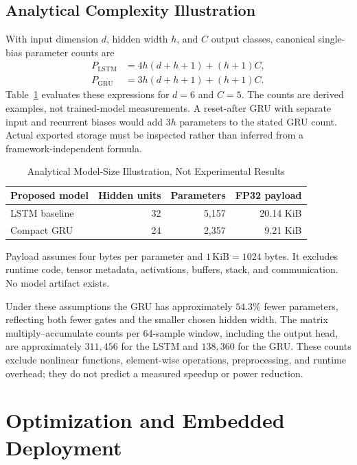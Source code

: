 \documentclass[conference]{IEEEtran}
\begin{document}
\subsection{Analytical Complexity Illustration}
With input dimension $d$, hidden width $h$, and $C$ output classes, canonical single-bias parameter counts are
\begin{align}
P_{\mathrm{LSTM}} &=4h(d+h+1)+(h+1)C,\\
P_{\mathrm{GRU}} &=3h(d+h+1)+(h+1)C.
\end{align}
Table~\ref{tab:analytical} evaluates these expressions for $d=6$ and $C=5$. The counts are derived examples, not trained-model measurements. A reset-after GRU with separate input and recurrent biases would add $3h$ parameters to the stated GRU count. Actual exported storage must be inspected rather than inferred from a framework-independent formula.

\begin{table}[t]
\caption{Analytical Model-Size Illustration, Not Experimental Results}
\label{tab:analytical}
\centering
\small
\begin{tabular}{@{}lrrr@{}}
\toprule
Proposed model & Hidden units & Parameters & FP32 payload\\
\midrule
LSTM baseline & 32 & 5,157 & 20.14 KiB\\
Compact GRU & 24 & 2,357 & 9.21 KiB\\
\bottomrule
\end{tabular}
\par\smallskip
\begin{minipage}{\columnwidth}\footnotesize
Payload assumes four bytes per parameter and $1\,\mathrm{KiB}=1024$ bytes. It excludes runtime code, tensor metadata, activations, buffers, stack, and communication. No model artifact exists.
\end{minipage}
\end{table}

Under these assumptions the GRU has approximately $54.3\%$ fewer parameters, reflecting both fewer gates and the smaller chosen hidden width. The matrix multiply--accumulate counts per $64$-sample window, including the output head, are approximately $311{,}456$ for the LSTM and $138{,}360$ for the GRU. These counts exclude nonlinear functions, element-wise operations, preprocessing, and runtime overhead; they do not predict a measured speedup or power reduction.

\section{Optimization and Embedded Deployment}
\end{document}

